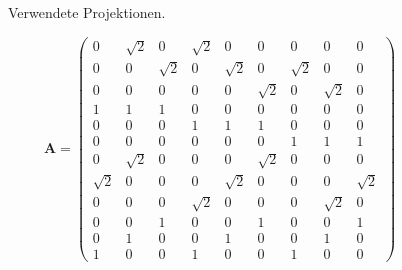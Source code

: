 \begin{figure}[h!]
    \centering
    
    \caption{Verwendete Projektionen.}
    \label{abb:2}
\end{figure}

\begin{equation}
  \label{eq:3}
    \mathbf{A} =
    \begin{pmatrix}
      0 & \sqrt{2} & 0 & \sqrt{2} & 0 & 0 & 0 & 0 & 0\\
      0 & 0 & \sqrt{2} & 0 & \sqrt{2} & 0 & \sqrt{2} & 0 & 0\\
      0 & 0 & 0 & 0 & 0 & \sqrt{2} & 0 & \sqrt{2} & 0\\
      1 & 1 & 1 & 0 & 0 & 0 & 0 & 0 & 0\\
      0 & 0 & 0 & 1 & 1 & 1 & 0 & 0 & 0\\
      0 & 0 & 0 & 0 & 0 & 0 & 1 & 1 & 1\\
      0 & \sqrt{2} & 0 & 0 & 0 & \sqrt{2} & 0 & 0 & 0\\
      \sqrt{2} & 0 & 0 & 0 & \sqrt{2} & 0 & 0 & 0 & \sqrt{2}\\
      0 & 0 & 0 & \sqrt{2} & 0 & 0 & 0 & \sqrt{2} & 0\\
      0 & 0 & 1 & 0 & 0 & 1 & 0 & 0 & 1\\
      0 & 1 & 0 & 0 & 1 & 0 & 0 & 1 & 0\\
      1 & 0 & 0 & 1 & 0 & 0 & 1 & 0 & 0
    \end{pmatrix}
 \end{equation}
